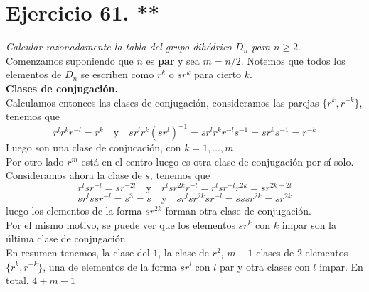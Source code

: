 \section{Ejercicio 61. **} \emph{Calcular razonadamente la tabla del grupo dihédrico \(D_{n}\) para \(n \geq 2\)}.\\


Comenzamos suponiendo que \(n\) es \textbf{par} y sea \(m = n/2\). Notemos que todos los elementos de \(D_{n}\) se escriben como \(r^{k}\) o \(sr^{k}\) para cierto \(k\).\\

\textbf{Clases de conjugación.}\\
Calculamos entonces las clases de conjugación, consideramos las parejas \(\{r^{k}, r^{-k}\}\), tenemos que
\[
  r^{l}r^{k}r^{-l} = r^{k} \quad \text{y} \quad sr^{l}r^{k}(sr^{l})^{-1} = sr^{l}r^{k}r^{-l}s^{-1} = sr^{k}s^{-1} = r^{-k}
\]
Luego son una clase de conjucación, con \(k=1,\dots,m\).\\

Por otro lado \(r^{m}\) está en el centro luego es otra clase de conjugación por sí solo.\\

Consideramos ahora la clase de \(s\), tenemos que
\[
  r^{l}sr^{-l} = sr^{-2l} \quad \text{y} \quad r^{l}sr^{2k}r^{-l} = r^{l}sr^{-l}r^{2k} = sr^{2k-2l}
\]
\[
  sr^{l}ssr^{-l} = s^{3} = s \quad \text{y} \quad sr^{l}sr^{2k}sr^{-l} = sssr^{2k} = sr^{2k}
\]
luego los elementos de la forma \(sr^{2k}\) forman otra clase de conjugación.\\

Por el mismo motivo, se puede ver que los elementos \(sr^{k}\) con \(k\) impar son la última clase de conjugación.\\

En resumen tenemos, la clase del \(1\), la clase de \(r^{2}\), \(m-1\)  clases de 2 elementos \(\{r^{k}, r^{-k}\}\), una de elementos de la forma \(sr^{l}\) con \(l\) par y otra clases con \(l\) impar. En total, \(4 + m-1\)  \\

